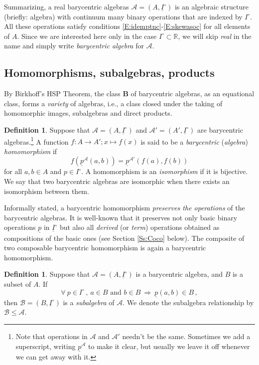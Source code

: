 \documentclass[12pt]{amsart}
\theoremstyle{plain}
\theoremstyle{definition}
\newtheorem{definition}[theorem]{Definition}
\numberwithin{equation}{section}
\begin{document}
Summarizing, a real barycentric algebras $\mathcal{A}=(A,\underline{I}^{\circ})$ is an algebraic structure (briefly: algebra) with continuum many binary operations that are indexed by $I^\circ$. All these operations satisfy conditions \eqref{E:idemptnc}-\eqref{E:skewasoc} for all elements of $A$. Since we are interested here only in the case $I^\circ\subset\mathbb{R}$, we will skip \emph{real} in the name and simply write \emph{barycentric algebra} for $\mathcal{A}$.

\subsection{Homomorphisms, subalgebras, products}
By Birkhoff's HSP Theorem, the class $\mathbf{B}$ of barycentric algebras, as an equational class, forms a \emph{variety} of algebras, i.e., a class closed under the taking of homomorphic images, subalgebras and direct products.
\begin{definition}\label{D:BaHomSet}
Suppose that $\mathcal{A}=(A,\underline{I}^{\circ})$ and $\mathcal{A}'=(A',\underline{I}^{\circ})$ are barycentric algebras.\footnote{Note that operations in $\mathcal{A}$ and $\mathcal{A}'$ needn't be the same. Sometimes we add a superscript, writing $\underline{p}^{\mathcal{A}}$ to make it clear, but usually we leave it off whenever we can get away with it.}
A function $f\colon A\to A';x\mapsto f(x)$ is said to be a \emph{barycentric} (\emph{algebra}) \emph{homomorphism} if
\begin{equation}\label{E:BaryAHom}
f(\underline p^{\mathcal{A}}(a,b))=\underline p^{\mathcal{A}'}(f(a),f(b))
\end{equation}
for all $a,b\in A$ and $p\in I^\circ$.
A homomorphism is an \emph{isomorphism} if it is bijective. We say that two barycentric algebras are isomorphic when there exists an isomorphism between them.
\end{definition}
Informally stated, a barycentric homomorphism \emph{preserves the operations} of the barycentric algebras. It is well-known that it preserves not only basic binary operations $\underline{p}$ in $\underline{I}^{\circ}$ but also all \emph{derived} (or \emph{term}) operations obtained as compositions of the basic ones (see Section \ref{Ss:Coco} below). The composite of two composable barycentric homomorphism is again a barycentric homomorphism.

\begin{definition}\label{D:Sb}
Suppose that $\mathcal{A}=(A,\underline{I}^{\circ})$ is a barycentric algebra, and $B$ is a subset of $A$.
If
$$
\forall\ p\in I^\circ\,,\
a\in B
\mbox{ and }
b\in B
\
\Rightarrow
\
\underline p(a,b)\in B\,,
$$
then $\mathcal{B}=(B,\underline{I}^{\circ})$ is a \emph{subalgebra} of $\mathcal{A}$. We denote the subalgebra relationship by $\mathcal{B}\leq \mathcal{A}$.
\end{definition}
\end{document}
